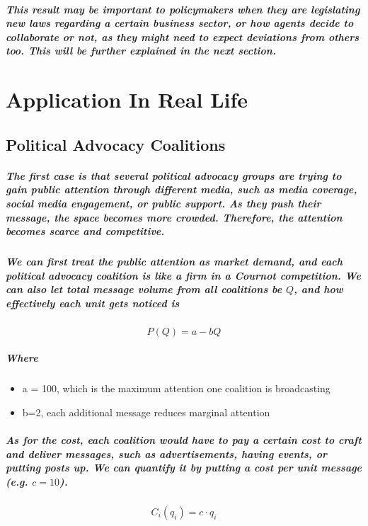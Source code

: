 \documentclass[11pt]{report}
\begin{document}
\paragraph{This result may be important to policymakers when they are legislating new laws regarding a certain business sector, or how agents decide to collaborate or not, as they might need to expect deviations from others too. This will be further explained in the next section.}



\chapter{Application In Real Life}

\section{Political Advocacy Coalitions}
\paragraph{The first case is that several political advocacy groups are trying to gain public attention through different media, such as media coverage, social media engagement, or public support. As they push their message, the space becomes more crowded. Therefore, the attention becomes scarce and competitive. }
\paragraph{We can first treat the public attention as market demand, and each political advocacy coalition is like a firm in a Cournot competition. We can also let total message volume from all coalitions be $Q$, and how effectively each unit gets noticed is }
\[P(Q)=a-bQ\]
\paragraph{Where }
\begin{itemize}
	\item a = 100, which is the maximum attention one coalition is broadcasting
	\item b=2, each additional message reduces marginal attention
\end{itemize}
\paragraph{As for the cost, each coalition would have to pay a certain cost to craft and deliver messages, such as advertisements, having events, or putting posts up. We can quantify it by putting a cost per unit message (e.g. $c=10$). }
\[C_i(q_i)=c\cdot q_i \]
\end{document}
